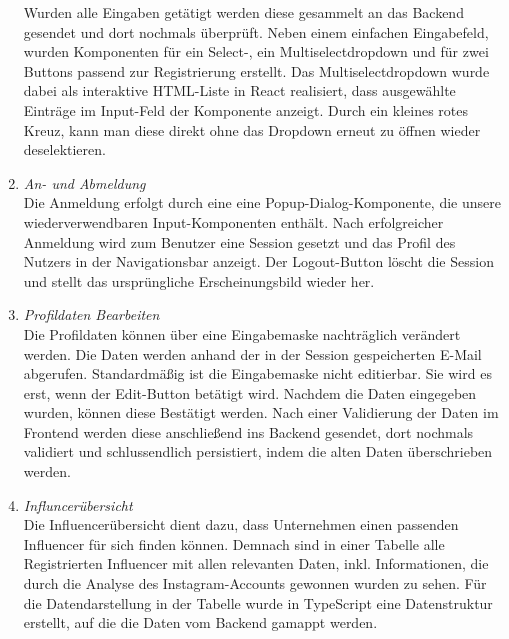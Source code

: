 \documentclass[conference,a4paper,flushend]{cs-techrep}
\begin{document}
\begin{enumerate}
Wurden alle Eingaben getätigt werden diese gesammelt an das Backend gesendet und dort nochmals überprüft.
Neben einem einfachen Eingabefeld, wurden Komponenten für ein Select-, ein Multiselectdropdown und für zwei Buttons passend zur Registrierung erstellt. Das Multiselectdropdown wurde dabei als interaktive HTML-Liste in React realisiert, dass ausgewählte Einträge im Input-Feld der Komponente anzeigt. Durch ein kleines rotes Kreuz, kann man diese direkt ohne das Dropdown erneut zu öffnen wieder deselektieren.
\\
\item{\textit{An- und Abmeldung}}\\
Die Anmeldung erfolgt durch eine eine Popup-Dialog-Komponente, die unsere wiederverwendbaren Input-Komponenten enthält. Nach erfolgreicher Anmeldung wird zum Benutzer eine Session gesetzt und das Profil des Nutzers in der Navigationsbar anzeigt. Der Logout-Button löscht die Session und stellt das ursprüngliche Erscheinungsbild wieder her.
\\
\item{\textit{Profildaten Bearbeiten}}\\
Die Profildaten können über eine Eingabemaske nachträglich verändert werden. Die Daten werden anhand der in der Session gespeicherten E-Mail abgerufen. Standardmäßig ist die Eingabemaske nicht editierbar. Sie wird es erst, wenn der Edit-Button betätigt wird. Nachdem die Daten eingegeben wurden, können diese Bestätigt werden. Nach einer Validierung der Daten im Frontend werden diese anschließend ins Backend gesendet, dort nochmals validiert und schlussendlich persistiert, indem die alten Daten überschrieben werden.
\\
\item{\textit{Influncerübersicht}}\\
Die Influencerübersicht dient dazu, dass Unternehmen einen passenden Influencer für sich finden können. Demnach sind in einer Tabelle alle Registrierten Influencer mit allen relevanten Daten, inkl. Informationen, die durch die Analyse des Instagram-Accounts gewonnen wurden zu sehen. %
Für die Datendarstellung in der Tabelle wurde in TypeScript eine Datenstruktur erstellt, auf die die Daten vom Backend gamappt werden. %

\end{enumerate}
\end{document}
